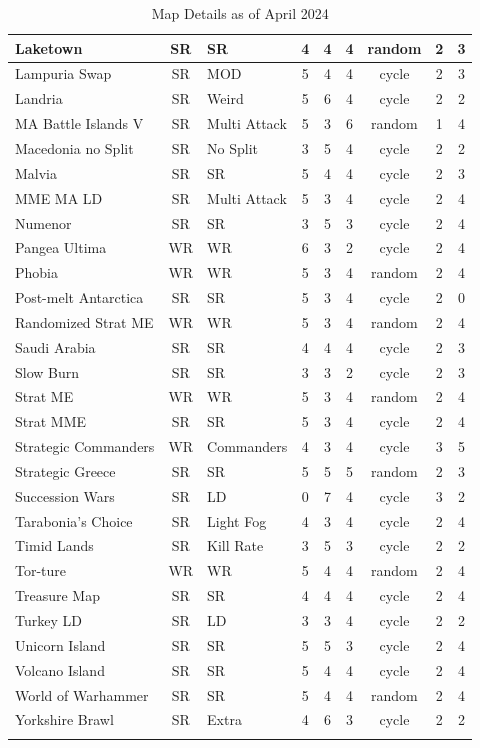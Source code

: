 \begin{longtable}{|p{2.5cm}|c|p{1.5cm}|c|c|c|c|c|c|}
Laketown & SR & SR & 4 & 4 & 4 & random & 2 & 3 \\ \hline
Lampuria Swap & SR & MOD & 5 & 4 & 4 & cycle & 2 & 3 \\ \hline
Landria & SR & Weird & 5 & 6 & 4 & cycle & 2 & 2 \\ \hline
\rowcolor{Light_Blue}
MA Battle Islands V & SR & Multi Attack & 5 & 3 & 6 & random & 1 & 4 \\ \hline
Macedonia no Split & SR & No Split & 3 & 5 & 4 & cycle & 2 & 2 \\ \hline
Malvia & SR & SR & 5 & 4 & 4 & cycle & 2 & 3 \\ \hline
MME MA LD & SR & Multi Attack & 5 & 3 & 4 & cycle & 2 & 4 \\ \hline
Numenor & SR & SR & 3 & 5 & 3 & cycle & 2 & 4 \\ \hline
Pangea Ultima & WR & WR & 6 & 3 & 2 & cycle & 2 & 4 \\ \hline
\rowcolor{Light_Blue}
Phobia & WR & WR & 5 & 3 & 4 & random & 2 & 4 \\ \hline
Post-melt Antarctica & SR & SR & 5 & 3 & 4 & cycle & 2 & 0 \\ \hline
\rowcolor{Light_Blue}
Randomized Strat ME & WR & WR & 5 & 3 & 4 & random & 2 & 4 \\ \hline
Saudi Arabia & SR & SR & 4 & 4 & 4 & cycle & 2 & 3 \\ \hline
Slow Burn & SR & SR & 3 & 3 & 2 & cycle & 2 & 3 \\ \hline
\rowcolor{Light_Blue}
Strat ME & WR & WR & 5 & 3 & 4 & random & 2 & 4 \\ \hline
Strat MME & SR & SR & 5 & 3 & 4 & cycle & 2 & 4 \\ \hline
Strategic Commanders & WR & Commanders & 4 & 3 & 4 & cycle & 3 & 5 \\ \hline
\rowcolor{Light_Blue}
Strategic Greece & SR & SR & 5 & 5 & 5 & random & 2 & 3 \\ \hline
Succession Wars & SR & LD & 0 & 7 & 4 & cycle & 3 & 2 \\ \hline
Tarabonia's Choice & SR & Light Fog & 4 & 3 & 4 & cycle & 2 & 4 \\ \hline
Timid Lands & SR & Kill Rate & 3 & 5 & 3 & cycle & 2 & 2 \\ \hline
\rowcolor{Light_Blue}
Tor-ture & WR & WR & 5 & 4 & 4 & random & 2 & 4 \\ \hline
Treasure Map & SR & SR & 4 & 4 & 4 & cycle & 2 & 4 \\ \hline
Turkey LD & SR & LD & 3 & 3 & 4 & cycle & 2 & 2 \\ \hline
Unicorn Island & SR & SR & 5 & 5 & 3 & cycle & 2 & 4 \\ \hline
Volcano Island & SR & SR & 5 & 4 & 4 & cycle & 2 & 4 \\ \hline
\rowcolor{Light_Blue}
World of Warhammer & SR & SR & 5 & 4 & 4 & random & 2 & 4 \\ \hline
Yorkshire Brawl & SR & Extra & 4 & 6 & 3 & cycle & 2 & 2 \\ \hline

\caption{Map Details as of April 2024}
\label{tab:map-details}
\end{longtable}

\normalsize



